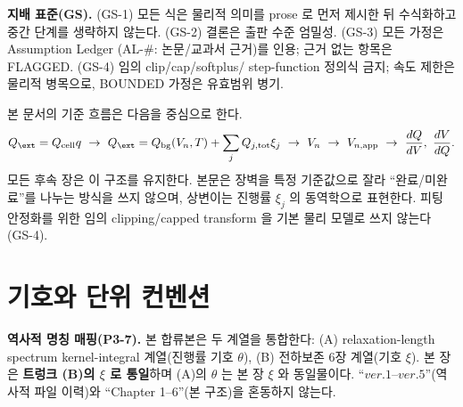 \begin{groundingbox}
\textbf{지배 표준(GS).} (GS-1) 모든 식은 물리적 의미를 prose 로 먼저 제시한 뒤 수식화하고 중간
단계를 생략하지 않는다. (GS-2) 결론은 출판 수준 엄밀성. (GS-3) 모든 가정은 Assumption Ledger
(AL-\#: 논문/교과서 근거)를 인용; 근거 없는 항목은 FLAGGED. (GS-4) 임의 clip/cap/softplus/
step-function 정의식 금지; 속도 제한은 물리적 병목으로, BOUNDED 가정은 유효범위 병기.
\end{groundingbox}

본 문서의 기준 흐름은 다음을 중심으로 한다.
\begin{equation}
Q_\ext=Q_\cell q
\ \rightarrow\
Q_\ext=Q_\bg(V_n,T)+\sum_j Q_{j,\tot}\xi_j
\ \rightarrow\
V_n
\ \rightarrow\
V_{n,\app}
\ \rightarrow\
\frac{dQ}{dV},\ \frac{dV}{dQ}.
\label{eq:masterflow}
\end{equation}
모든 후속 장은 이 구조를 유지한다. 본문은 장벽을 특정 기준값으로 잘라 ``완료/미완료''를 나누는
방식을 쓰지 않으며, 상변이는 진행률 $\xi_j$ 의 동역학으로 표현한다. 피팅 안정화를 위한 임의
clipping/capped transform 을 기본 물리 모델로 쓰지 않는다(GS-4).

\newpage

\section{기호와 단위 컨벤션}\label{sec:notation}
\textbf{역사적 명칭 매핑(P3-7).} 본 합류본은 두 계열을 통합한다: (A) relaxation-length spectrum
kernel-integral 계열(진행률 기호 $\theta$), (B) 전하보존 6장 계열(기호 $\xi$). 본 장은 \textbf{트렁크
(B)의 $\xi$ 로 통일}하며 (A)의 $\theta$ 는 본 장 $\xi$ 와 동일물이다. ``$ver.1$--$ver.5$''(역사적 파일
이력)와 ``Chapter 1--6''(본 구조)을 혼동하지 않는다.

